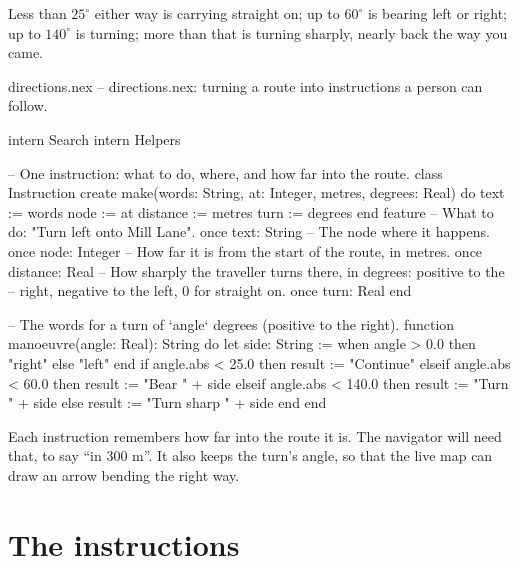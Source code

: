 Less than $25^\circ$ either way is carrying straight on; up to $60^\circ$
is bearing left or right; up to $140^\circ$ is turning; more than that is
turning sharply, nearly back the way you came.

\begin{newfile}{directions.nex}
-- directions.nex: turning a route into instructions a person can follow.

intern Search
intern Helpers

-- One instruction: what to do, where, and how far into the route.
class Instruction
create
  make(words: String, at: Integer, metres, degrees: Real) do
    text := words
    node := at
    distance := metres
    turn := degrees
  end
feature
  -- What to do: "Turn left onto Mill Lane".
  once text: String
  -- The node where it happens.
  once node: Integer
  -- How far it is from the start of the route, in metres.
  once distance: Real
  -- How sharply the traveller turns there, in degrees: positive to the
  -- right, negative to the left, 0 for straight on.
  once turn: Real
end

-- The words for a turn of `angle` degrees (positive to the right).
function manoeuvre(angle: Real): String do
  let side: String := when angle > 0.0 then "right" else "left" end
  if angle.abs < 25.0 then
    result := "Continue"
  elseif angle.abs < 60.0 then
    result := "Bear " + side
  elseif angle.abs < 140.0 then
    result := "Turn " + side
  else
    result := "Turn sharp " + side
  end
end
\end{newfile}

Each instruction remembers how far into the route it is. The navigator
will need that, to say ``in 300 m''. It also keeps the turn's angle, so
that the live map can draw an arrow bending the right way.

\section{The instructions}

